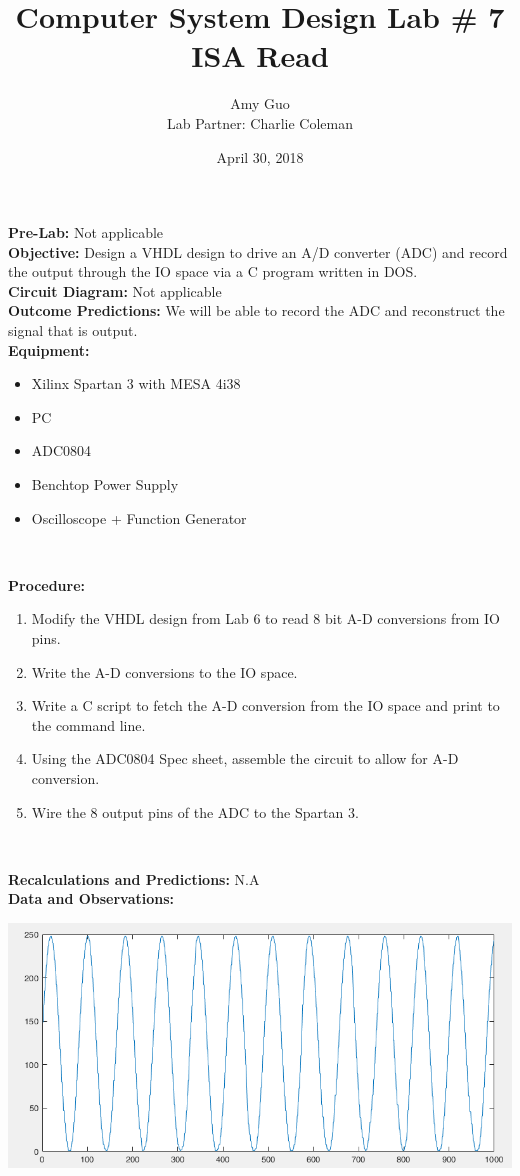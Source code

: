 \documentclass{article}
\title{Computer System Design Lab \# 7\\ISA Read}
\author{Amy Guo \\ Lab Partner: Charlie Coleman}
\date{April 30, 2018}
\newcommand{\sect}[1]{\noindent\textbf{#1}}
\begin{document}
\maketitle
\pagebreak

\sect{Pre-Lab:} Not applicable\\

\sect{Objective:} Design a VHDL design to drive an A/D converter (ADC) and record the output through the IO space via a C program written in DOS.\\

\sect{Circuit Diagram:} Not applicable\\

\sect{Outcome Predictions:} We will be able to record the ADC and reconstruct the signal that is output.\\

\sect{Equipment:}

\begin{itemize}[noitemsep, nolistsep]
	\item Xilinx Spartan 3 with MESA 4i38
	\item PC
	\item ADC0804
	\item Benchtop Power Supply
	\item Oscilloscope + Function Generator
\end{itemize}~

\sect{Procedure:}

\begin{enumerate}
	\item Modify the VHDL design from Lab 6 to read 8 bit A-D conversions from IO pins.
	\item Write the A-D conversions to the IO space.
	\item Write a C script to fetch the A-D conversion from the IO space and print to the command line.
	\item Using the ADC0804 Spec sheet, assemble the circuit to allow for A-D conversion.
	\item Wire the 8 output pins of the ADC to the Spartan 3.
\end{enumerate}~

\sect{Recalculations and Predictions:} N.A\\

\sect{Data and Observations:}

\begin{center}\includegraphics[width=\textwidth]{plot}\end{center}
\end{document}
